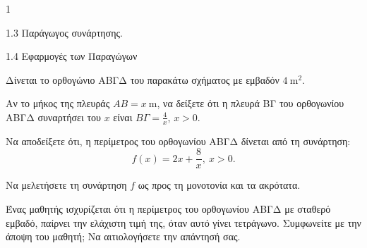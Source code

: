 \begin{ylh}{1}
    \item 1.3 Παράγωγος συνάρτησης.
    \item 1.4 Εφαρμογές των Παραγώγων
\end{ylh}
\begin{center}
\end{center}
Δίνεται το ορθογώνιο ΑΒΓΔ του παρακάτω σχήματος με εμβαδόν $4\ \text{m}^2$.
\begin{alist}
    \item Αν το μήκος της πλευράς $AB = x\ \text{m}$, να δείξετε ότι η πλευρά ΒΓ του ορθογωνίου ΑΒΓΔ συναρτήσει του $x$ είναι $B\varGamma = \frac{4}{x}$, $x>0$.

    \item Να αποδείξετε ότι, η περίμετρος του ορθογωνίου ΑΒΓΔ δίνεται από τη συνάρτηση:
    \[ f(x) = 2x+\frac{8}{x}, \ x>0. \]

    \item Να μελετήσετε τη συνάρτηση $f$ ως προς τη μονοτονία και τα ακρότατα.

    \item Ένας μαθητής ισχυρίζεται ότι η περίμετρος του ορθογωνίου ΑΒΓΔ με σταθερό εμβαδό, παίρνει την ελάχιστη τιμή της, όταν αυτό γίνει τετράγωνο. Συμφωνείτε με την άποψη του μαθητή; Να αιτιολογήσετε την απάντησή σας.
\end{alist}

